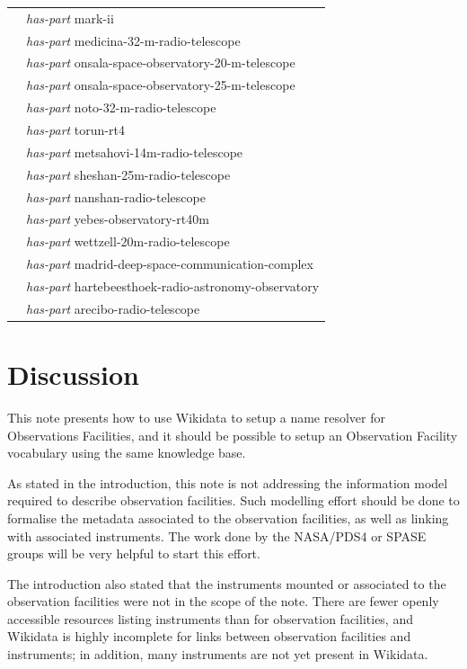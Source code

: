 \documentclass[11pt,a4paper]{ivoa}
\begin{document}
{\begin{longtable}{p{}p{}}
                        & \emph{has-part} mark-ii\\
                        & \emph{has-part} medicina-32-m-radio-telescope\\
                        & \emph{has-part} onsala-space-observatory-20-m-telescope\\
                        & \emph{has-part} onsala-space-observatory-25-m-telescope\\
                        & \emph{has-part} noto-32-m-radio-telescope\\
                        & \emph{has-part} torun-rt4\\
                        & \emph{has-part} metsahovi-14m-radio-telescope\\
                        & \emph{has-part} sheshan-25m-radio-telescope\\
                        & \emph{has-part} nanshan-radio-telescope\\
                        & \emph{has-part} yebes-observatory-rt40m\\
                        & \emph{has-part} wettzell-20m-radio-telescope\\
                        & \emph{has-part} madrid-deep-space-communication-complex\\
                        & \emph{has-part} hartebeesthoek-radio-astronomy-observatory\\
                        & \emph{has-part} arecibo-radio-telescope\\
\hline
\end{longtable}}

\section{Discussion}
This note presents how to use Wikidata to setup a name resolver
for Observations Facilities, and it should be possible to setup
an Observation Facility vocabulary using the same knowledge base.

As stated in the introduction, this note is not addressing the
information model required to describe observation facilities.
Such modelling effort should be done to formalise the metadata
associated to the observation facilities, as well as linking
with associated instruments. The work done by the NASA/PDS4 or
SPASE groups will be very helpful to start this effort.

The introduction also stated that the instruments mounted or
associated to the observation facilities were not in the scope
of the note. There are fewer openly accessible resources
listing instruments than for observation facilities, and
Wikidata is highly incomplete for links between observation facilities
and instruments; in addition, many instruments
are not yet present in Wikidata.
\end{document}
